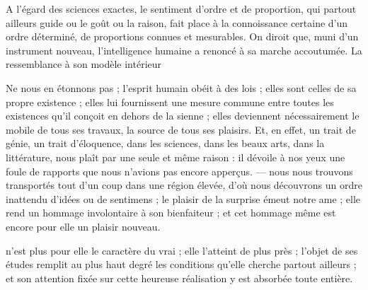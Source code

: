 \documentclass[11pt,a4paper]{article}
\begin{document}
A l'égard des sciences exactes, le sentiment d'ordre et de proportion, qui
partout ailleurs guide ou le goût ou la raison, fait place à la connoissance
certaine d'un ordre déterminé, de proportions connues et mesurables. On diroit
que, muni d'un instrument nouveau, l'intelligence humaine a renoncé à sa marche
accoutumée. La ressemblance à son modèle intérieur



Ne nous en étonnons pas ; l'esprit humain obéit à des lois ; elles sont celles
de sa propre existence ; elles lui fournissent une mesure commune entre toutes
les existences qu'il conçoit en dehors de la sienne ; elles deviennent
nécessairement le mobile de tous ses travaux, la source de tous ses plaisirs.
Et, en effet, un trait de génie, un trait d'éloquence, dans les sciences, dans
les beaux arts, dans la  littérature, nous plaît par une
seule et même raison : il dévoile à nos yeux  une foule de rapports
que nous n'avions pas encore apperçus. — nous nous trouvons 
transportés tout d'un coup dans une région élevée, d'où nous découvrons un
ordre  inattendu d'idées ou de sentimens ; le plaisir de la
surprise émeut notre ame ; elle rend un hommage involontaire à son bienfaiteur ;
et  cet hommage même est
 encore pour elle un plaisir nouveau.


n'est plus pour elle le caractère du vrai ; elle l'atteint de plus près ;
l'objet de ses études remplit au plus haut degré les conditions qu'elle cherche
partout ailleurs ; et son attention fixée sur cette heureuse réalisation y est
absorbée toute entière.
\end{document}
